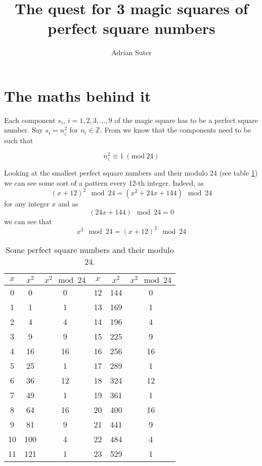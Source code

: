 \documentclass[reqno,10pt,a4paper]{article}
\title{The quest for 3 \time 3 magic squares of perfect square numbers}
\author{Adrian Suter}
\begin{document}
	
	\maketitle
	
	\section{The maths behind it}
	
	Each component $s_i$, $i = 1, 2, 3, \ldots, 9$ of the magic square has to be a perfect square number. Say $s_i = n_i^2$ for $n_i \in \mathbb{Z}$. From \cite{zimmermann2015} we know that the components need to be such that
	
	\begin{equation} \label{eq:conditionMod24}
		n_i^2 \equiv 1~(\textrm{mod}~24)
	\end{equation}
	
	Looking at the smallest perfect square numbers and their modulo 24 (see table \ref{perfectSquares}) we can see some sort of a pattern every 12-th integer. Indeed, as
	\begin{equation}
	(x + 12)^2 \mod 24 = (x^2 + 24x + 144) \mod 24
	\end{equation}
	for any integer $x$ and as
	\begin{equation}
	(24x + 144) \mod 24 = 0
	\end{equation}
	we can see that
	\begin{equation}
	x^2 \mod 24 = (x + 12)^2 \mod 24
	\end{equation}
	
	\begin{table}
			\begin{tabular}{|c|c|c||c|c|c|}
			\hline
			$x$ & $x^2$ & $x^2 \mod 24$ & $x$ & $x^2$ & $x^2 \mod 24$ \\
			\hline
			0 & 0 & 0 & 12 & 144 & 0 \\
			1 & 1 & 1 & 13 & 169 & 1 \\
			2 & 4 & 4 & 14 & 196 & 4 \\
			3 & 9 & 9 & 15 & 225 & 9 \\
			4 & 16 & 16 & 16 & 256 & 16 \\
			5 & 25 & 1 & 17 & 289 & 1 \\
			6 & 36 & 12 & 18 & 324 & 12 \\
			7 & 49 & 1 & 19 & 361 & 1 \\
			8 & 64 & 16 & 20 & 400 & 16 \\
			9 & 81 & 9 & 21 & 441 & 9 \\
			10 & 100 & 4 & 22 & 484 & 4 \\
			11 & 121 & 1 & 23 & 529 & 1 \\
			\hline
		\end{tabular}
		\caption{Some perfect square numbers and their modulo 24.} \label{perfectSquares}
	\end{table}
	
\end{document}
